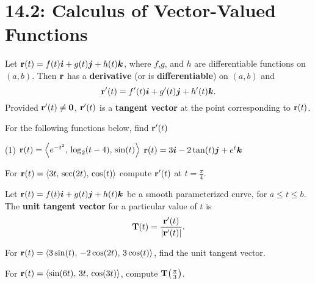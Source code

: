 \documentclass[mathNotesPreamble]{subfiles}
\begin{document}
\section{14.2: Calculus of Vector-Valued Functions}
  \begin{defn*}
    Let ${\mathbf{r}}(t)=f(t){\bm{i}}+g(t){\bm{j}}+h(t){\bm{k}}$, where $f$,$g$, and $h$ are differentiable functions on $(a,b)$. Then ${\mathbf{r}}$ has a \textbf{derivative} (or is \textbf{differentiable}) on $(a,b)$ and
      \[{\mathbf{r}}'(t)=f'(t){\bm{i}}+g'(t){\bm{j}}+h'(t){\bm{k}}.\]
    Provided ${\mathbf{r}}'(t)\neq \mathbf{0}$, ${\mathbf{r}}'(t)$ is a \textbf{tangent vector} at the point corresponding to ${\mathbf{r}}(t)$.
  \end{defn*}
  \begin{ex*}
    For the following functions below, find ${\mathbf{r}}'(t)$
  \end{ex*}
  \begin{tasks}[after-item-skip=\stretch{1}](1)
    \task ${\mathbf{r}}(t)={\left\langle e^{-t^2},\,\log_2(t-4),\,\sin(t) \right\rangle}$
    \task ${\mathbf{r}}(t)=3{\bm{i}}-2\tan(t){\bm{j}}+e^t{\bm{k}}$
  \end{tasks}
  \begin{ex*}
    For ${\mathbf{r}}(t)={\left\langle 3t,\,\sec(2t),\,\cos(t) \right\rangle}$ compute ${\mathbf{r}}'(t)$ at $t=\frac{\pi}{4}$.
  \end{ex*}
  \pagebreak
  
  \begin{defn*}
    Let ${\mathbf{r}}(t)=f(t){\bm{i}}+g(t){\bm{j}}+h(t){\bm{k}}$ be a smooth parameterized curve, for $a\leq t\leq b$. The \textbf{unit tangent vector} for a particular value of $t$ is
      \[\mathbf T(t)=\frac{{\mathbf{r}}'(t)}{{\left\vert{\mathbf{r}}'(t)\right\vert}}.\]
  \end{defn*}
  \begin{ex*}
    For ${\mathbf{r}}(t)={\left\langle 3\sin(t),\,-2\cos(2t),\,3\cos(t) \right\rangle}$, find the unit tangent vector.
  \end{ex*}
  \begin{ex*}
    For ${\mathbf{r}}(t)={\left\langle \sin(6t),\,3t,\,\cos(3t) \right\rangle}$, compute $\mathbf T{\left(\frac{\pi}{3}\right)}$.
  \end{ex*}
  \pagebreak
\end{document}
